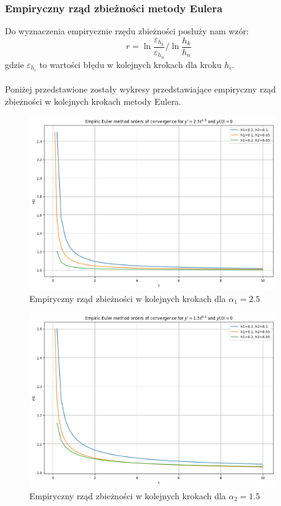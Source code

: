 \documentclass{article}
\begin{document}
\subsubsection{Empiryczny rząd zbieżności metody Eulera}
Do wyznaczenia empirycznie rzędu zbieżności posłuży nam wzór:
$$r = \ln{\frac{\varepsilon_{h_k}}{\varepsilon_{h_n}}} / \ln{\frac{h_k}{h_n}}$$
gdzie $\varepsilon_{h_i}$ to wartości błędu w kolejnych krokach dla kroku $h_i$.
\\\\
Poniżej przedstawione zostały wykresy przedstawiające empiryczny rząd zbieżności w kolejnych krokach metody Eulera.
\begin{figure}[H]
    \centering
    \includegraphics[width=0.95\textwidth]{4}
    \caption{Empiryczny rząd zbieżności w kolejnych krokach dla $\alpha_1 = 2.5$}
    \label{fig:mesh}
\end{figure}
\begin{figure}[H]
    \centering
    \includegraphics[width=0.95\textwidth]{5}
    \caption{Empiryczny rząd zbieżności w kolejnych krokach dla $\alpha_2 = 1.5$}
    \label{fig:mesh}
\end{figure}
\end{document}
